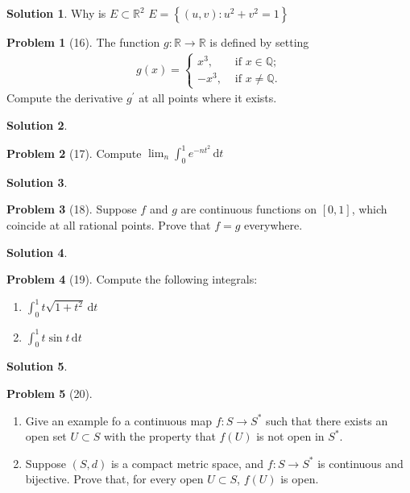 \documentclass[12pt]{article}
\theoremstyle{definition} %
\newtheorem{solution}{Solution}
\newtheorem{problem}{Problem}
\theoremstyle{plain} %
\begin{document}
\begin{solution}
    Why is $E\subset \mathbb{{R}}^{2}$  $E=\left\{ (u,v):u^{2}+v^{2}=1 \right\} $ 
\end{solution}
\begin{problem}[16]
    The function $g: \mathbb{{R}}\to \mathbb{{R}}$ is defined by setting 
    \begin{align}
        g(x) = \begin{cases}
            x^{3}, &\text{ if }  x\in \mathbb{{Q}};\\
            -x^{3}, &\text{ if }  x \neq \mathbb{{Q}}.
        \end{cases}
    \end{align}  
   Compute the derivative $g^\prime $ at all points where it exists.  
\end{problem}
\begin{solution}
    
\end{solution}
\begin{problem}[17]
   Compute $\lim_{n} \int_{0}^{1} e^{-nt^{2}} \,\mathrm{d}t $  
\end{problem}
\begin{solution}
    
\end{solution}
\begin{problem}[18]
   Suppose $f$ and $g$ are continuous functions on $[0,1]$, which coincide at all rational points. Prove that $f=g$ everywhere.  
\end{problem}
\begin{solution}
    
\end{solution}
\begin{problem}[19]
   Compute the following integrals:
   \begin{enumerate}
    \item $\int_{0}^{1} t\sqrt{1+t^{2}}  \,\mathrm{d}t $
    \item $\int_{0}^{1} t \sin t \,\mathrm{d}t $  
   \end{enumerate} 
\end{problem}
\begin{solution}
    
\end{solution}
\begin{problem}[20]
   \begin{enumerate}
    \item Give an example fo a continuous map $f: S\to S^{*}$ such that there exists an open set $U \subset S$ with the property that $f(U)$ is not open in $S^{*}$.
    \item Suppose $(S,d)$ is a compact metric space, and $f:S\to S^{*}$ is continuous and bijective. Prove that, for every open $U \subset S$, $f(U)$ is open.       
   \end{enumerate} 
\end{problem}
\end{document}
